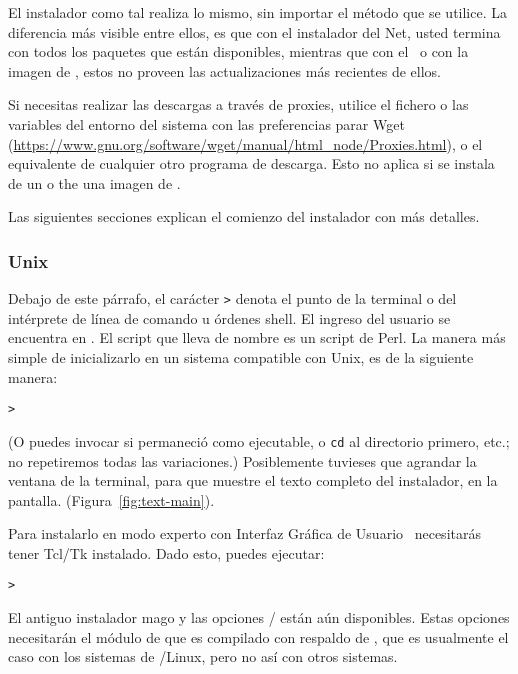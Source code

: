 \documentclass{article}
\begin{document}
El instalador como tal realiza lo mismo, sin importar el método que
se utilice. La diferencia más visible entre ellos, es que con el
instalador del Net, usted termina con todos los paquetes que están
disponibles, mientras que con el \DVD\ o con la imagen de
\ISO, estos no proveen las actualizaciones más recientes de
ellos.

Si necesitas realizar las descargas a través de proxies, utilice el fichero  o las variables del entorno del sistema con las preferencias parar Wget (\url{https://www.gnu.org/software/wget/manual/html_node/Proxies.html}), o el equivalente de cualquier otro programa de descarga. Esto no aplica si se instala de un \DVD o the una imagen de \ISO.

\noindent
Las siguientes secciones explican el comienzo del instalador con más
detalles.

\subsubsection{Unix}

Debajo de este párrafo, el carácter \texttt{>} denota el
punto de la terminal o del intérprete de línea de comando u órdenes shell.
El ingreso del usuario se encuentra en
.  El script que lleva de nombre
 es un script de Perl. La manera más
simple de inicializarlo en un sistema compatible con Unix, es
de la siguiente manera: 

\begin{alltt} 
	>  
\end{alltt} 

(O puedes invocar  si
permaneció como ejecutable, o \texttt{cd} al directorio
primero, etc.; no repetiremos todas las variaciones.)
Posiblemente tuvieses que agrandar la ventana de la
terminal, para que muestre el texto completo del instalador,
en la pantalla.  (Figura~\ref{fig:text-main}).

Para instalarlo en modo experto con Interfaz Gráfica de
Usuario \GUI\, necesitarás tener Tcl/Tk instalado. Dado
esto, puedes ejecutar:
\begin{alltt}
	> 
\end{alltt}

El antiguo instalador mago  y las opciones
/ están aún disponibles. 
Estas opciones necesitarán el módulo de  que es compilado con
respaldo de , que es usualmente el caso con los sistemas de
\GNU/Linux, pero no así con otros sistemas. 
\end{document}

